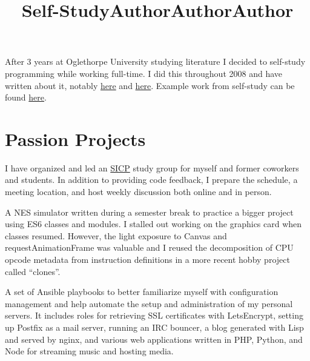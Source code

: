 \documentclass[margintitle,line]{res}
\renewcommand{\subsection}[1]{\section{\normalfont #1}}
\begin{document}
\begin{resume}
\title{Self-Study}
\begin{position}
  After 3 years at Oglethorpe University studying literature
  I decided to self-study programming while working full-time.
  I did this throughout 2008 and have written about it, notably
  \href{https://blog.kingcons.io/posts/Leaving-College-to-Leverage-Compulsion.html}{here}
  and
  \href{https://blog.kingcons.io/posts/Spring-2008-Schedule-and-Syllabus.html}{here}.
  Example work from self-study can be found
  \href{https://blog.kingcons.io/posts/SICP-Section-13.html}{here}.
\end{position}


\pagebreak

\setlength{\parskip}{1ex}


\subsection{Passion Projects}

\title{Author}
\begin{position}
  I have organized and led an \href{https://sarabander.github.io/sicp/}{SICP} study group for
  myself and former coworkers and students. In addition to providing code feedback,
  I prepare the schedule, a meeting location, and host weekly discussion both online and in person.
\end{position}

\title{Author}
\begin{position}
  A NES simulator written during a semester break to practice a bigger project
  using ES6 classes and modules. I stalled out working on the graphics card
  when classes resumed. However, the light exposure to Canvas and requestAnimationFrame
  was valuable and I reused the decomposition of CPU opcode metadata from instruction
  definitions in a more recent hobby project called ``clones''.
\end{position}

\title{Author}
\begin{position}
  A set of Ansible playbooks to better familiarize myself with configuration management
  and help automate the setup and administration of my personal servers. It includes roles
  for retrieving SSL certificates with LetsEncrypt, setting up Postfix as a mail server,
  running an IRC bouncer, a blog generated with Lisp and served by nginx, and various
  web applications written in PHP, Python, and Node for streaming music and hosting media.
\end{position}


\end{resume}
\end{document}
